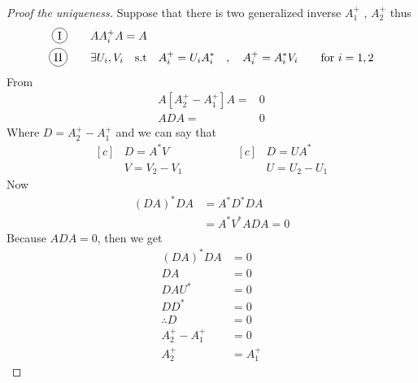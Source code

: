 \begin{proof}[\textcolor{theme}{Proof the uniqueness}]
    Suppose that there is two generalized inverse $A_1^{+}$ , $A_2^{+}$ thus
    \begin{align*}
        \circled{I}  & \dquad AA_i^{+}A = A
        \\
        \circled{II} & \dquad \exists  U_i,V_i \quad \text{s.t} \quad A_i^{+} = U_i A_i^{*} \quad,\quad A_i^{+} = A_i^{*}V_i \dquad \text{for }i=1,2
    \end{align*}
    From 
    \begin{align*}
        A[A_2^{+}-A_1^{+}]A = & 0
        \\
        ADA=                  & 0
    \end{align*}
    Where $D = A_2^{+}-A_1^{+}$ and we can say that
    \begin{equation*}
        \begin{aligned}[c]
             & D = A^{*}V
            \\
             & V = V_2-V_1
        \end{aligned}
        \qquad\qquad
        \begin{aligned}[c]
             & D = UA^{*}
            \\
             & U = U_2-U_1
        \end{aligned}
    \end{equation*}
    Now
    \begin{align*}
        (DA)^{*}DA & = A^* D^{*} D A
        \\
                   & = A^* V^{*}A D A = 0
    \end{align*}
    Because $ADA=0$, then we get
    \begin{align*}
        (DA)^{*}DA      & = 0
        \\
        DA              & = 0 \tag{multiply $U^*$ from the right}
        \\
        DA U^*          & = 0
        \\
        DD^{*}          & = 0
        \\
        \therefore D    & = 0
        \\
        A_2^{+}-A_1^{+} & = 0
        \\
        A_2^{+}         & =A_1^{+}
    \end{align*}
\end{proof}
